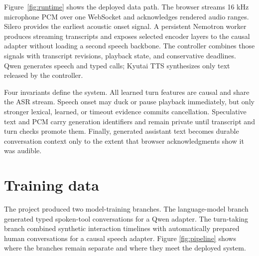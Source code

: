 \documentclass[10pt,twocolumn]{article}
\begin{document}
Figure~\ref{fig:runtime} shows the deployed data path. The browser streams 16 kHz microphone PCM
over one WebSocket and acknowledges rendered audio ranges. Silero provides the earliest acoustic
onset signal. A persistent Nemotron worker produces streaming transcripts and exposes selected
encoder layers to the causal adapter without loading a second speech backbone. The controller
combines those signals with transcript revisions, playback state, and conservative deadlines.
Qwen generates speech and typed calls; Kyutai TTS \cite{kyutai} synthesizes only text released by
the controller.

Four invariants define the system. All learned turn features are causal and share the ASR stream.
Speech onset may duck or pause playback immediately, but only stronger lexical, learned, or timeout
evidence commits cancellation. Speculative text and PCM carry generation identifiers and remain
private until transcript and turn checks promote them. Finally, generated assistant text becomes
durable conversation context only to the extent that browser acknowledgments show it was audible.

\section{Training data}

The project produced two model-training branches. The language-model branch generated typed
spoken-tool conversations for a Qwen adapter. The turn-taking branch combined synthetic interaction
timelines with automatically prepared human conversations for a causal speech adapter. Figure
\ref{fig:pipeline} shows where the branches remain separate and where they meet the deployed system.
\end{document}
